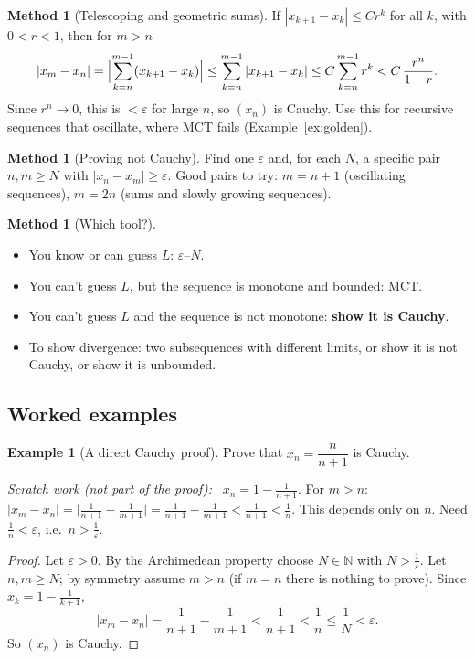 \documentclass[11pt]{article}
\theoremstyle{definition}
\newtheorem{ex}[defn]{Example}
\newtheorem{method}[defn]{Method}
\newcommand{\N}{\mathbb{N}}
\newcommand{\eps}{\varepsilon}
\newenvironment{scratch}{\par\medskip\noindent\textit{Scratch work (not part of the proof):}\ }{\par\medskip}
\begin{document}
\begin{method}[Telescoping and geometric sums]\label{meth:geom}
If $|x_{k+1}-x_k|\le Cr^k$ for all $k$, with $0<r<1$, then for $m>n$
\[
|x_m-x_n|
=\Bigl|\sum_{k=n}^{m-1}(x_{k+1}-x_k)\Bigr|
\le\sum_{k=n}^{m-1}|x_{k+1}-x_k|
\le C\sum_{k=n}^{m-1}r^k
< C\,\frac{r^n}{1-r}.
\]
Since $r^n\to0$, this is $<\eps$ for large $n$, so $(x_n)$ is Cauchy. Use
this for recursive sequences that oscillate, where MCT fails
(Example~\ref{ex:golden}).
\end{method}

\begin{method}[Proving not Cauchy]
Find one $\eps$ and, for each $N$, a specific pair $n,m\ge N$ with
$|x_n-x_m|\ge\eps$. Good pairs to try: $m=n+1$ (oscillating sequences),
$m=2n$ (sums and slowly growing sequences).
\end{method}

\begin{method}[Which tool?]
\begin{itemize}[nosep]
  \item You know or can guess $L$: $\eps$--$N$.
  \item You can't guess $L$, but the sequence is monotone and bounded: MCT.
  \item You can't guess $L$ and the sequence is not monotone: \textbf{show
        it is Cauchy}.
  \item To show divergence: two subsequences with different limits, or
        show it is not Cauchy, or show it is unbounded.
\end{itemize}
\end{method}

\subsection{Worked examples}

\begin{ex}[A direct Cauchy proof]\label{ex:cdirect}
Prove that $x_n=\dfrac{n}{n+1}$ is Cauchy.

\begin{scratch}
$x_n=1-\frac1{n+1}$. For $m>n$:
$|x_m-x_n|=\bigl|\frac1{n+1}-\frac1{m+1}\bigr|=\frac1{n+1}-\frac1{m+1}<\frac1{n+1}<\frac1n$.
This depends only on $n$. Need $\frac1n<\eps$, i.e.\ $n>\frac1\eps$.
\end{scratch}

\begin{proof}
Let $\eps>0$. By the Archimedean property choose $N\in\N$ with
$N>\frac1\eps$. Let $n,m\ge N$; by symmetry assume $m>n$ (if $m=n$ there
is nothing to prove). Since $x_k=1-\frac1{k+1}$,
\[
|x_m-x_n|=\frac1{n+1}-\frac1{m+1}<\frac1{n+1}<\frac1n\le\frac1N<\eps.
\]
So $(x_n)$ is Cauchy.
\end{proof}
\end{ex}
\end{document}
